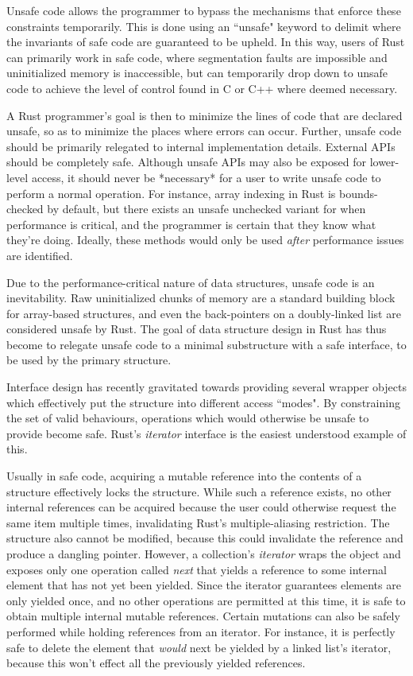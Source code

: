 \documentclass{cccg13}
\begin{document}
Unsafe code allows the programmer to bypass the mechanisms that enforce these constraints temporarily. This is done using an ``unsafe" keyword to delimit where the invariants of safe code are guaranteed to be upheld. In this way, users of Rust can primarily work in safe code, where segmentation faults are impossible and uninitialized memory is inaccessible, but can temporarily drop down to unsafe code to achieve the level of control found in C or C++ where deemed necessary.

A Rust programmer's goal is then to minimize the lines of code that are declared unsafe, so as to minimize the places where errors can occur. Further, unsafe code should be primarily relegated to internal implementation details. External APIs should be completely safe. Although unsafe APIs may also be exposed for lower-level access, it should never be *necessary* for a user to write unsafe code to perform a normal operation. For instance, array indexing in Rust is bounds-checked by default, but there exists an unsafe unchecked variant for when performance is critical, and the programmer is certain that they know what they're doing. Ideally, these methods would only be used \emph{after} performance issues are identified.

Due to the performance-critical nature of data structures, unsafe code is an inevitability. Raw uninitialized chunks of memory are a standard building block for array-based structures, and even the back-pointers on a doubly-linked list are considered unsafe by Rust. The goal of data structure design in Rust has thus become to relegate unsafe code to a minimal substructure with a safe interface, to be used by the primary structure.

Interface design has recently gravitated towards providing several wrapper objects which effectively put the structure into different access ``modes". By constraining the set of valid behaviours, operations which would otherwise be unsafe to provide become safe. Rust's \emph{iterator} interface is the easiest understood example of this.

Usually in safe code, acquiring a mutable reference into the contents of a structure effectively locks the structure. While such a reference exists, no other internal references can be acquired because the user could otherwise request the same item multiple times, invalidating Rust's multiple-aliasing restriction. The structure also cannot be modified, because this could invalidate the reference and produce a dangling pointer. However, a collection's \emph{iterator} wraps the object and exposes only one operation called \emph{next} that yields a reference to some internal element that has not yet been yielded. Since the iterator guarantees elements are only yielded once, and no other operations are permitted at this time, it is safe to obtain multiple internal mutable references. Certain mutations can also be safely performed while holding references from an iterator. For instance, it is perfectly safe to delete the element that \emph{would} next be yielded by a linked list's iterator, because this won't effect all the previously yielded references.
\end{document}
